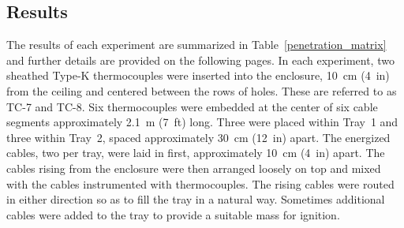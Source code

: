 \clearpage


\subsection{Results}

The results of each experiment are summarized in Table~\ref{penetration_matrix} and further details are provided on the following pages. In each experiment, two sheathed Type-K thermocouples were inserted into the enclosure, 10~cm (4~in) from the ceiling and centered between the rows of holes. These are referred to as TC-7 and TC-8. Six thermocouples were embedded at the center of six cable segments approximately 2.1~m (7~ft) long. Three were placed within Tray~1 and three within Tray~2, spaced approximately 30~cm (12~in) apart. The energized cables, two per tray, were laid in first, approximately 10~cm (4~in) apart. The cables rising from the enclosure were then arranged loosely on top and mixed with the cables instrumented with thermocouples. The rising cables were routed in either direction so as to fill the tray in a natural way. Sometimes additional cables were added to the tray to provide a suitable mass for ignition.


